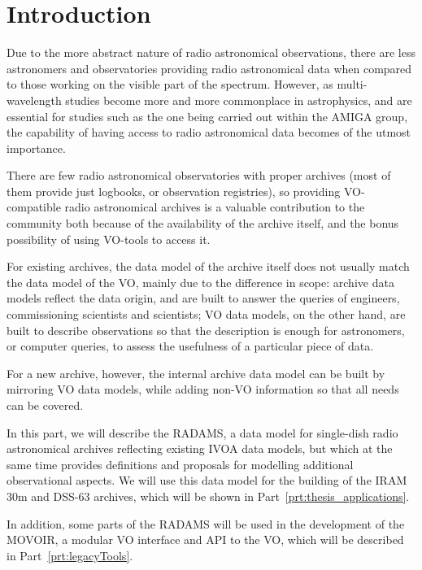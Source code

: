 
\chapter{Introduction} %
\label{cha:introduction}
	
	Due to the more abstract nature of radio astronomical
	observations, there are less astronomers and observatories
	providing radio astronomical data when compared to those
	working on the visible part of the spectrum. However, as
	multi-wavelength studies become more and more commonplace in
	astrophysics, and are essential for studies such as the one
	being carried out within the AMIGA group, the capability of
	having access to radio astronomical data becomes of the utmost
	importance.
	
	 There are few radio astronomical observatories with proper
	archives (most of them provide just logbooks, or observation
	registries), so providing VO-compatible radio
	astronomical archives is a valuable contribution to the
	community both because of the availability of the archive
	itself, and
	the bonus possibility of using VO-tools to access it.
	
	 For existing archives, the data model of the archive itself
	does not usually match the data model of the VO, mainly due to
	the difference in scope: archive data models reflect the data
	origin, and are built to answer the queries of engineers,
	commissioning scientists and scientists; VO data models, on the
	other hand, are built to describe observations so that the
	description is enough for astronomers, or computer queries, to
	assess the usefulness of a particular piece of data.
	
	 For a new archive, however, the internal archive data model
	can be built by mirroring VO data models, while adding non-VO
	information so that all needs can be covered.
	

	 In this part, we will describe the RADAMS, a data model for
	single-dish radio astronomical archives reflecting existing
	IVOA data models, but which at the same time provides
	definitions and proposals for modelling additional
	observational aspects. We will use this data model for the
	building of the IRAM 30m and DSS-63 archives, which will be
	shown  in
	Part~\ref{prt:thesis_applications}.
	
	 In addition, some parts
	of the RADAMS will be used in the development of the MOVOIR, 
	a modular VO interface and API to the VO, which will be
	described in Part~\ref{prt:legacyTools}.
	
